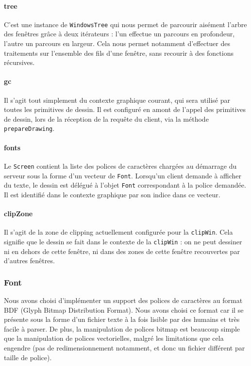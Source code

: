 \paragraph{tree}
C'est une instance de \verb|WindowsTree| qui nous permet de parcourir aisément l'arbre des fenêtres grâce à deux itérateurs : l'un effectue un parcours en profondeur, l'autre un parcours en largeur. Cela nous permet notamment d'effectuer des traitements sur l'ensemble des fils d'une fenêtre, sans recourir à des fonctions récursives.

\paragraph{gc}
Il s'agit tout simplement du contexte graphique courant, qui sera utilisé par toutes les primitives de dessin. Il est configuré en amont de l'appel des primitives de dessin, lors de la réception de la requête du client, via la méthode \verb|prepareDrawing|.

\paragraph{fonts}
Le \verb|Screen| contient la liste des polices de caractères chargées au démarrage du serveur sous la forme d'un vecteur de \verb|Font|. Lorsqu'un client demande à afficher du texte, le dessin est délégué à l'objet \verb|Font| correspondant à la police demandée. Il est identifié dans le contexte graphique par son indice dans ce vecteur.

\paragraph{clipZone}
Il s'agit de la zone de clipping actuellement configurée pour la \verb|clipWin|. Cela signifie que le dessin se fait dans le contexte de la \verb|clipWin| : on ne peut dessiner ni en dehors de cette fenêtre, ni dans des zones de cette fenêtre recouvertes par d'autres fenêtres.

\subsubsection{Font}
Nous avons choisi d'implémenter un support des polices de caractères au format BDF (Glyph Bitmap Distribution Format). Nous avons choisi ce format car il se présente sous la forme d'un fichier texte à la fois lisible par des humains et très facile à parser. De plus, la manipulation de polices bitmap est beaucoup simple que la manipulation de polices vectorielles, malgré les limitations que cela engendre (pas de redimensionnement notamment, et donc un fichier différent par taille de police).

